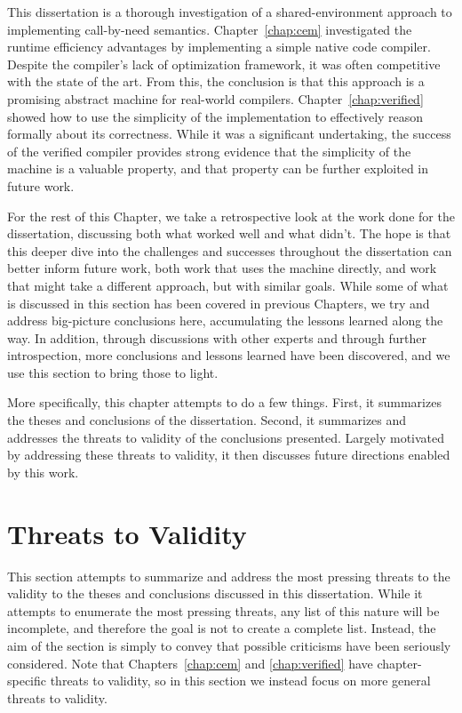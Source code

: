 This dissertation is a thorough investigation of a shared-environment approach
to implementing call-by-need semantics. Chapter~\ref{chap:cem} investigated the
runtime efficiency advantages by implementing a simple native code compiler.
Despite the compiler's lack of optimization framework, it was often competitive
with the state of the art. From this, the conclusion is that this approach is a
promising abstract machine for real-world compilers. Chapter~\ref{chap:verified}
showed how to use the simplicity of the implementation to effectively reason
formally about its correctness. While it was a significant undertaking, the
success of the verified compiler provides strong evidence that the simplicity of
the machine is a valuable property, and that property can be further exploited
in future work.

For the rest of this Chapter, we take a retrospective look at the work done for
the dissertation, discussing both what worked well and what didn't. The hope is that
this deeper dive into the challenges and successes throughout the dissertation
can better inform future work, both work that uses the \ce machine directly, and
work that might take a different approach, but with similar goals. While some of
what is discussed in this section has been covered in previous Chapters, we try
and address big-picture conclusions here, accumulating the lessons learned along
the way. In addition, through discussions with other experts and through further
introspection, more conclusions and lessons learned have been discovered, and we
use this section to bring those to light. 

More specifically, this chapter attempts to do a few things. First, it
summarizes the theses and conclusions of the dissertation. Second, it summarizes
and addresses the threats to validity of the conclusions presented.  Largely
motivated by addressing these threats to validity, it then discusses future
directions enabled by this work. 

\section{Threats to Validity}

This section attempts to summarize and address the most pressing threats to the
validity to the theses and conclusions discussed in this dissertation. While it
attempts to enumerate the most pressing threats, any list of this nature will be
incomplete, and therefore the goal is not to create a complete list. Instead,
the aim of the section is simply to convey that possible criticisms have been
seriously considered. Note that Chapters~\ref{chap:cem} and \ref{chap:verified}
have chapter-specific threats to validity, so in this section we instead focus
on more general threats to validity. 

